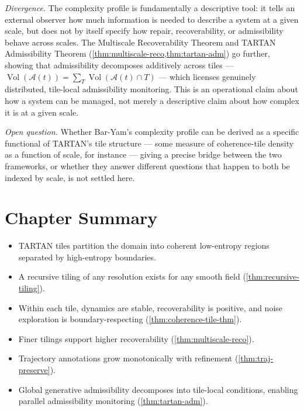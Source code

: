 \documentclass[12pt,twoside,openright]{book}
\newcommand{\adm}{\mathcal{A}}
\newcommand{\Vol}{\operatorname{Vol}}
\newenvironment{chapsummary}{%
  \begin{tcolorbox}[colback=DistBlue!5,colframe=DistBlue,
    title={\faBookOpen\enspace Summary},
    fonttitle=\sffamily\bfseries\color{white},
    attach boxed title to top left={yshift=-2mm,xshift=4mm},
    boxed title style={colback=DistBlue,rounded corners}]
  \begin{itemize}[nosep,leftmargin=*]}{%
  \end{itemize}\end{tcolorbox}}
\begin{document}
\emph{Divergence.} The complexity profile is fundamentally a
descriptive tool: it tells an external observer how much
information is needed to describe a system at a given scale, but
does not by itself specify how repair, recoverability, or
admissibility behave across scales. The Multiscale Recoverability
Theorem and TARTAN Admissibility Theorem
(\cref{thm:multiscale-reco,thm:tartan-adm}) go further, showing
that admissibility decomposes additively across tiles ---
$\Vol(\adm(t)) = \sum_T \Vol(\adm(t)\cap T)$ --- which licenses
genuinely distributed, tile-local admissibility monitoring. This
is an operational claim about how a system can be managed, not
merely a descriptive claim about how complex it is at a given
scale.

\emph{Open question.} Whether Bar-Yam's complexity profile can be
derived as a specific functional of TARTAN's tile structure ---
some measure of coherence-tile density as a function of scale,
for instance --- giving a precise bridge between the two
frameworks, or whether they answer different questions that
happen to both be indexed by scale, is not settled here.

\section*{Chapter Summary}
\begin{chapsummary}
  \item TARTAN tiles partition the domain into coherent
        low-entropy regions separated by high-entropy
        boundaries.
  \item A recursive tiling of any resolution exists for
        any smooth field (\cref{thm:recursive-tiling}).
  \item Within each tile, dynamics are stable,
        recoverability is positive, and noise exploration
        is boundary-respecting
        (\cref{thm:coherence-tile-thm}).
  \item Finer tilings support higher recoverability
        (\cref{thm:multiscale-reco}).
  \item Trajectory annotations grow monotonically with
        refinement (\cref{thm:traj-preserve}).
  \item Global generative admissibility decomposes into
        tile-local conditions, enabling parallel
        admissibility monitoring
        (\cref{thm:tartan-adm}).
\end{chapsummary}
\end{document}
